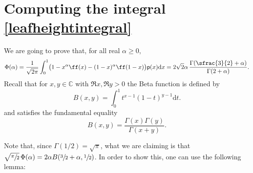 \documentclass[JEP,XML,SOM,Unicode,NoFloatCountersInSection, NoEqCountersInSection,published]{cedram}
\newcommand{\pp}{\mathsf{p}}
\newcommand{\dd}{\mathrm{d}}
\theoremstyle{definition}
\begin{document}
\section{Computing the integral \texorpdfstring{\eqref{leafheightintegral}}{ref}}\label{sec: Appendix}
We are going to prove that, for all real $\alpha\geq 0$,
\begin{equation}\label{eq:Phi(alpha)}
\Phi(\alpha) = \frac{1}{\sqrt{2\pi}}\int_{0}^1 \bigl(1-x^{\alpha}\ff(x)-(1-x)^{\alpha}\ff(1-x) \bigr) \pp(x) \dd x=2\sqrt{2}\alpha\,\frac{\Gamma(\sfrac{3}{2}+\alpha)}{\Gamma(2+\alpha)}.
\end{equation}
Recall that for $x, y \in \mathbb{C}$ with $\Re x, \Re y > 0$ the Beta function is defined by
\[
B(x,y) = \int_0^1 t^{x-1} (1-t)^{y-1} \dd t.
\]
and satisfies the fundamental equality
\[
B(x,y) = \frac{\Gamma(x)\Gamma(y)}{\Gamma(x+y)}.
\]

Note that, since $\Gamma(1/2)=\sqrt{\pi}$, what we are claiming is that $\sqrt{\sfrac{\pi}{2}}\,\Phi(\alpha)=2\alpha B(\sfrac{3}{2}+\alpha, \sfrac{1}{2})$. In order to show this, one can use the following lemma:
\end{document}
